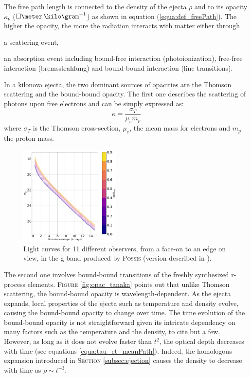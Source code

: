 \documentclass[a4paper, twoside, 11pt]{article}
\numberwithin{equation}{section}
\begin{document}
The free path length is connected to the density of the ejecta $\rho$ and to its opacity $\kappa_\nu$  (${\square\meter\,\kilo\gram^{-1}}$) as shown in equation (\ref{equa:def_freePath}). 
The higher the opacity, the more the radiation interacts with matter either through 
\begin{enumerate*}[label=\roman*)]
	\item  a scattering event,
	\item  an absorption event including bound-free interaction (photoionization), free-free interaction (bremsstrahlung) and bound-bound interaction (line transitions). 
\end{enumerate*} In a kilonova ejecta, the two dominant sources of opacities are the Thomson scattering and the bound-bound opacity. The first one describes the scattering of photons upon free electrons and can be simply expressed as: 
\begin{equation}
    \kappa = \frac{\sigma_T}{\mu_e m_p}
\end{equation}
where $\sigma_T$ is the Thomson cross-section, $\mu_e$, the mean mass for electrons and $m_p$ the proton mass. \\
\begin{figure}
\centering
\includegraphics[width=0.45\textwidth]{pictures/lc_11obs.pdf}
\caption[Light curves for different viewing angles]{Light curves for 11 different observers, from a face-on  to an edge on view, in the g band produced by P\textsc{ossis} (version described in \cite{POSSIS_2019}).}
\label{fig:observationsLC}
\end{figure}

The second one involves bound-bound transitions of the freshly synthesized r-process elements. F\textsc{igure} \ref{fig:opac_tanaka} points out that unlike Thomson scattering, the bound-bound opacity is wavelength-dependent. As the ejecta expands, local properties of the ejecta such as temperature and density evolve, causing the bound-bound opacity to change over time.  The time evolution of the bound-bound opacity is not straightforward given its intricate dependency on many factors such as the temperature and the density, to cite but a few. 
However, as long as it does not evolve faster than $t^2$, the optical depth decreases with time (see equations \ref{equa:tau_et_meanPath}). Indeed, the homologous expansion introduced in S\textsc{ection} \ref{subsec:ejection} causes the density to decrease with time as $\rho \sim t^{-3}$. \\
\end{document}

